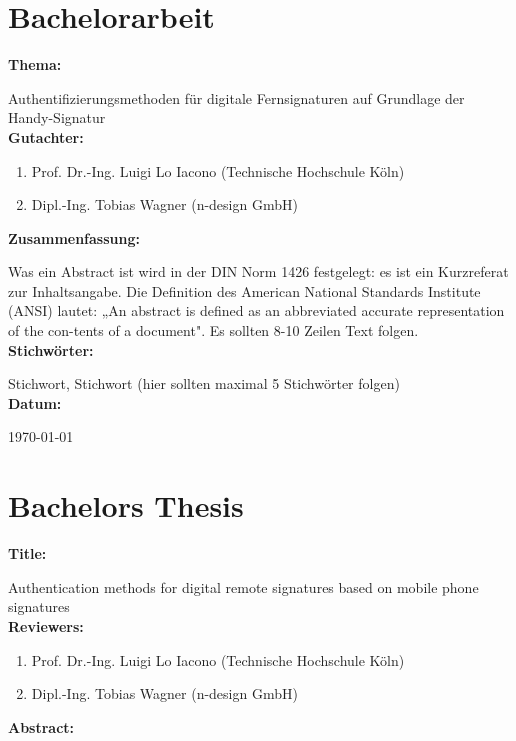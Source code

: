 \documentclass[11pt,a4paper,ngerman]{report}
\begin{document}
\maketitle

\chapter*{Bachelorarbeit}
\textbf{Thema:}

Authentifizierungsmethoden für digitale Fernsignaturen auf Grundlage der Handy-Signatur
\\[4ex]
\textbf{Gutachter:}
\begin{enumerate}
    \item Prof. Dr.-Ing. Luigi Lo Iacono (Technische Hochschule Köln)
    \item Dipl.-Ing. Tobias Wagner (n-design GmbH)
\end{enumerate}
\textbf{Zusammenfassung:}

Was ein Abstract ist wird in der DIN Norm 1426 festgelegt: es ist ein Kurzreferat zur Inhaltsangabe. Die Definition des American National Standards Institute (ANSI) lautet: „An abstract is defined as an abbreviated accurate representation of the con-tents of a document". Es sollten 8-10 Zeilen Text folgen.
\\[4ex]
\textbf{Stichwörter:}

Stichwort, Stichwort (hier sollten maximal 5 Stichwörter folgen)
\\[4ex]
\textbf{Datum:}

\today
\clearpage

\chapter*{Bachelors Thesis}
\textbf{Title:}

Authentication methods for digital remote signatures based on mobile phone signatures
\\[4ex]
\textbf{Reviewers:}
\begin{enumerate}
    \item Prof. Dr.-Ing. Luigi Lo Iacono (Technische Hochschule Köln)
    \item Dipl.-Ing. Tobias Wagner (n-design GmbH)
\end{enumerate}
\textbf{Abstract:}
\end{document}
